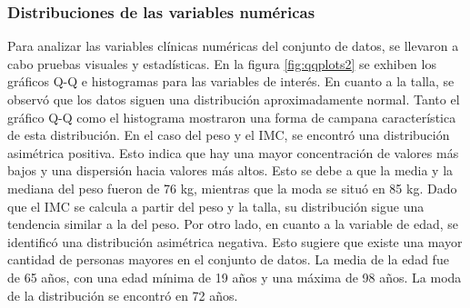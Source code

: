 \subsubsection{Distribuciones de las variables numéricas}
Para analizar las variables clínicas numéricas del conjunto de datos, se llevaron a cabo pruebas visuales y 
estadísticas. En la figura \ref{fig:qqplots2} se exhiben los gráficos Q-Q e histogramas para las variables 
de interés. En cuanto a la talla, se observó que los datos siguen una distribución aproximadamente normal. 
Tanto el gráfico Q-Q como el histograma mostraron una forma de campana característica de esta distribución. 
En el caso del peso y el IMC, se encontró una distribución asimétrica positiva. Esto indica que hay una mayor 
concentración de valores más bajos y una dispersión hacia valores más altos. Esto se debe a que la media y la 
mediana del peso fueron de 76 kg, mientras que la moda se situó en 85 kg. Dado que el IMC se calcula a partir 
del peso y la talla, su distribución sigue una tendencia similar a la del peso. Por otro lado, en cuanto a 
la variable de edad, se identificó una distribución asimétrica negativa. Esto sugiere que existe una mayor 
cantidad de personas mayores en el conjunto de datos. La media de la edad fue de 65 años, con una edad mínima 
de 19 años y una máxima de 98 años. La moda de la distribución se encontró en 72 años.

